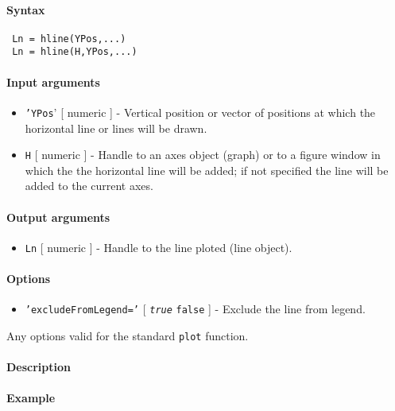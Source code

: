 


	\paragraph{Syntax}
 
 \begin{verbatim}
 Ln = hline(YPos,...)
 Ln = hline(H,YPos,...)
 \end{verbatim}
 
 \paragraph{Input arguments}
 
 \begin{itemize}
 \item
   \texttt{'YPos}' {[} numeric {]} - Vertical position or vector of
   positions at which the horizontal line or lines will be drawn.
 \item
   \texttt{H} {[} numeric {]} - Handle to an axes object (graph) or to a
   figure window in which the the horizontal line will be added; if not
   specified the line will be added to the current axes.
 \end{itemize}
 
 \paragraph{Output arguments}
 
 \begin{itemize}
 \item
   \texttt{Ln} {[} numeric {]} - Handle to the line ploted (line object).
 \end{itemize}
 
 \paragraph{Options}
 
 \begin{itemize}
 \item
   \texttt{'excludeFromLegend='} {[} \emph{\texttt{true}} \textbar{}
   \texttt{false} {]} - Exclude the line from legend.
 \end{itemize}
 
 Any options valid for the standard \texttt{plot} function.
 
 \paragraph{Description}
 
 \paragraph{Example}


